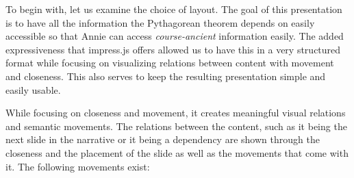 \documentclass{llncs}
\begin{document}
To begin with, let us examine the choice of layout. The goal of this presentation is to have all the information the Pythagorean theorem depends on easily accessible so that Annie can access \textit{course-ancient} information easily. The added expressiveness that impress.js offers allowed us to have this in a very structured format while focusing on visualizing relations between content with movement and closeness. This also serves to keep the resulting presentation simple and easily usable.

While focusing on closeness and movement, it creates meaningful visual relations and semantic movements. The relations between the content, such as it being the next slide in the narrative or it being a dependency are shown through the closeness and the placement of the slide as well as the movements that come with it. The following movements exist:
\end{document}
